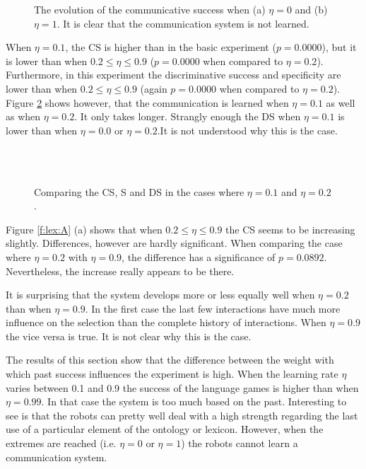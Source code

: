 \begin{figure}
\caption{The evolution of the communicative success when (a) $\eta=0$ and (b) $\eta=1$. It is clear that the communication system is not learned.}
\label{f:lex:csA0}
\end{figure}

When $\eta=0.1$, the CS is higher than in the basic experiment ($p=0.0000$), but it is lower than when $0.2\leq\eta\leq0.9$ ($p=0.0000$ when compared to $\eta=0.2$). Furthermore, in this experiment the discriminative success and specificity are lower than when $0.2\leq\eta\leq0.9$ (again $p=0.0000$ when compared to $\eta=0.2$). Figure \ref{f:lex:csA01} shows however, that the communication is learned when $\eta=0.1$ as well as when $\eta=0.2$. It only takes longer. Strangly enough the DS when $\eta=0.1$ is lower than when $\eta=0.0$ or $\eta=0.2$.It is not understood why this is the case.

\begin{figure}
\\
\\
\caption{Comparing the CS, S and DS in the cases where $\eta=0.1$ and $\eta=0.2$.}
\label{f:lex:csA01}
\end{figure}

 Figure \ref{f:lex:A} (a) shows that  when $0.2 \leq \eta \leq 0.9$ the CS seems to be increasing slightly. Differences, however are hardly significant. When comparing the case where $\eta=0.2$ with $\eta=0.9$, the difference has a significance of $p=0.0892$. Nevertheless, the increase really appears to be there. 

It is surprising that the system develops more or less equally well when $\eta=0.2$ than when $\eta=0.9$. In the first case the last few interactions have much more influence on the selection than the complete history of interactions. When $\eta=0.9$ the vice versa is true. It is not clear why this is the case.

\p
The results of this section show that the difference between the weight with which past success influences the experiment is high. When the learning rate $\eta$ varies between 0.1 and 0.9 the success of the language games is higher than when $\eta=0.99$. In that case the system is too much based on the past. Interesting to see is that the robots can pretty well deal with a high strength regarding the last use of a particular element of the ontology or lexicon. However, when the extremes are reached (i.e. $\eta=0$ or $\eta=1$) the robots cannot learn a communication system. 

